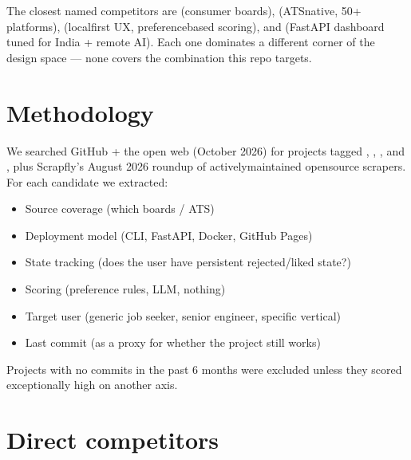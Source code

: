 \documentclass[a4paper,11pt,english]{sphinxmanual}
\begin{document}
\sphinxAtStartPar
The closest named competitors are  (consumer boards),
 (ATS\sphinxhyphen{}native, 50+ platforms), 
(local\sphinxhyphen{}first UX, preference\sphinxhyphen{}based scoring), and 
(FastAPI dashboard tuned for India + remote AI). Each one dominates a
different corner of the design space — none covers the combination this
repo targets.


\section{Methodology}
\label{\detokenize{analysis:methodology}}
\sphinxAtStartPar
We searched GitHub + the open web (October 2026) for projects tagged
, , , and , plus
Scrapfly’s August 2026 roundup of actively\sphinxhyphen{}maintained open\sphinxhyphen{}source
scrapers. For each candidate we extracted:
\begin{itemize}
\item {} 
\sphinxAtStartPar
Source coverage (which boards / ATS)

\item {} 
\sphinxAtStartPar
Deployment model (CLI, FastAPI, Docker, GitHub Pages)

\item {} 
\sphinxAtStartPar
State tracking (does the user have persistent rejected/liked state?)

\item {} 
\sphinxAtStartPar
Scoring (preference rules, LLM, nothing)

\item {} 
\sphinxAtStartPar
Target user (generic job seeker, senior engineer, specific vertical)

\item {} 
\sphinxAtStartPar
Last commit (as a proxy for whether the project still works)

\end{itemize}

\sphinxAtStartPar
Projects with no commits in the past 6 months were excluded unless they
scored exceptionally high on another axis.


\section{Direct competitors}
\label{\detokenize{analysis:direct-competitors}}
\end{document}
